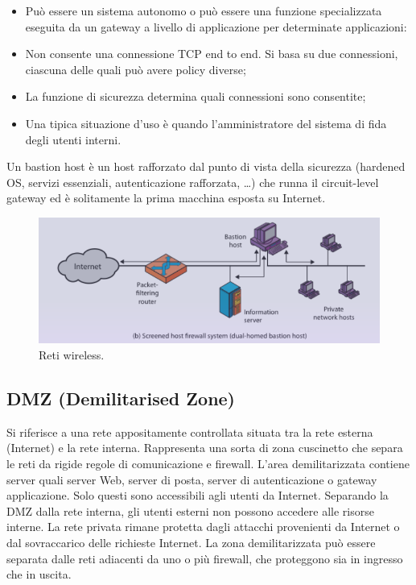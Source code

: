 \begin{itemize}
    \item Può essere un sistema autonomo o può essere una funzione specializzata eseguita da un gateway a livello di applicazione per determinate applicazioni:
	\item Non consente una connessione TCP end to end. Si basa su due connessioni, ciascuna delle quali può avere policy diverse;
	\item La funzione di sicurezza determina quali connessioni sono consentite;
	\item Una tipica situazione d'uso è quando l'amministratore del sistema di fida degli utenti interni.
\end{itemize}

Un bastion host è un host rafforzato dal punto di vista della sicurezza (hardened OS, servizi essenziali, autenticazione rafforzata, …) che runna il circuit-level gateway ed è solitamente la prima macchina esposta su Internet.

\begin{figure}[h]
    \centering
    \includegraphics[width=1\textwidth]{images/chapter7/7-5.png}
    \caption{Reti wireless.}
    \label{fig:7-5}
\end{figure}

\subsection{DMZ (Demilitarised Zone)}

Si riferisce a una rete appositamente controllata situata tra la rete esterna (Internet) e la rete interna. Rappresenta una sorta di zona cuscinetto che separa le reti da rigide regole di comunicazione e firewall. L'area demilitarizzata contiene server quali server Web, server di posta, server di autenticazione o gateway applicazione. Solo questi sono accessibili agli utenti da Internet. Separando la DMZ dalla rete interna, gli utenti esterni non possono accedere alle risorse interne. La rete privata rimane protetta dagli attacchi provenienti da Internet o dal sovraccarico delle richieste Internet. La zona demilitarizzata può essere separata dalle reti adiacenti da uno o più firewall, che proteggono sia in ingresso che in uscita.

